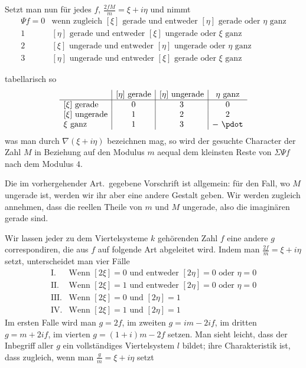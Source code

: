 Setzt man nun für jedes $f$, $\frac{2fM}{m}=\xi+i\eta$ und nimmt
\begingroup\small\setlength{\arraycolsep}{2pt}
\[
\begin{array}{rl}
\Psi f=0&\text{wenn zugleich }[\xi]\text{ gerade und entweder }[\eta]\text{ gerade oder }\eta\text{ ganz}\\
1&[\eta]\text{ gerade und entweder }[\xi]\text{ ungerade oder }\xi\text{ ganz}\\
2&[\xi]\text{ ungerade und entweder }[\eta]\text{ ungerade oder }\eta\text{ ganz}\\
3&[\eta]\text{ ungerade und entweder }[\xi]\text{ gerade oder }\xi\text{ ganz}
\end{array}
\]
\endgroup

tabellarisch so
\[
\begin{array}{l|c|c|c}
&[\eta]\text{ gerade}&[\eta]\text{ ungerade}&\eta\text{ ganz}\\\hline
[\xi]\text{ gerade}&0&3&0\\
\relax[\xi]\text{ ungerade}&1&2&2\\
\xi\text{ ganz}&1&3&-\ \pdot
\end{array}
\]
was man durch $\nabla(\xi+i\eta)$ bezeichnen mag, so wird der gesuchte Character der Zahl $M$ in Beziehung auf den Modulus $m$ aequal dem kleinsten Reste von $\Sigma\Psi f$ nach dem Modulus $4$.


Die im vorhergehender Art.\ gegebene Vorschrift ist allgemein: für den Fall, wo $M$ ungerade ist, werden wir ihr aber eine andere Gestalt geben. Wir werden zugleich annehmen, dass die reellen Theile von $m$ und $M$ ungerade, also die imaginären gerade sind.

Wir lassen jeder zu dem Viertelsysteme $k$ gehörenden Zahl $f$ eine andere $g$ correspondiren, die aus $f$ auf folgende Art abgeleitet wird. Indem man $\frac{2f}{m}=\xi+i\eta$ setzt, unterscheidet man vier Fälle
\[
\begin{array}{ll}
\mathrm{I.}&\text{Wenn }[2\xi]=0\text{ und entweder }[2\eta]=0\text{ oder }\eta=0\\
\mathrm{II.}&\text{Wenn }[2\xi]=1\text{ und entweder }[2\eta]=0\text{ oder }\eta=0\\
\mathrm{III.}&\text{Wenn }[2\xi]=0\text{ und }[2\eta]=1\\
\mathrm{IV.}&\text{Wenn }[2\xi]=1\text{ und }[2\eta]=1
\end{array}
\]
Im ersten Falle wird man $g=2f$, im zweiten $g=im-2if$, im dritten $g=m+2if$, im vierten $g=(1+i)m-2f$ setzen. Man sieht leicht, dass der Inbegriff aller $g$ ein vollständiges Viertelsystem $l$ bildet; ihre Charakteristik ist, dass zugleich, wenn man $\frac gm=\xi+i\eta$ setzt

